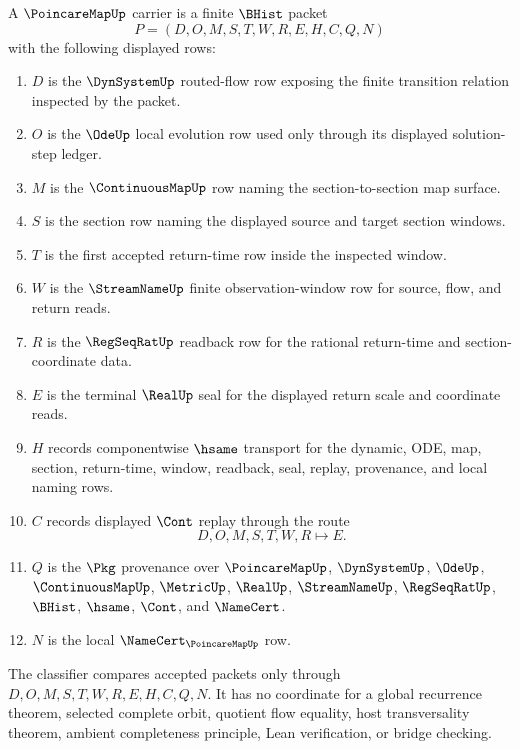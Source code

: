 \begin{definition}
\label{def:poincare-map-carrier}
A $\PoincareMapUp$ carrier is a finite $\BHist$ packet
$$
P=(D,O,M,S,T,W,R,E,H,C,Q,N)
$$
with the following displayed rows:
\begin{enumerate}
\item $D$ is the $\DynSystemUp$ routed-flow row exposing the finite transition relation inspected by the packet.
\item $O$ is the $\OdeUp$ local evolution row used only through its displayed solution-step ledger.
\item $M$ is the $\ContinuousMapUp$ row naming the section-to-section map surface.
\item $S$ is the section row naming the displayed source and target section windows.
\item $T$ is the first accepted return-time row inside the inspected window.
\item $W$ is the $\StreamNameUp$ finite observation-window row for source, flow, and return reads.
\item $R$ is the $\RegSeqRatUp$ readback row for the rational return-time and section-coordinate data.
\item $E$ is the terminal $\RealUp$ seal for the displayed return scale and coordinate reads.
\item $H$ records componentwise $\hsame$ transport for the dynamic, ODE, map, section, return-time, window, readback, seal, replay, provenance, and local naming rows.
\item $C$ records displayed $\Cont$ replay through the route
$$
D,O,M,S,T,W,R \longmapsto E .
$$
\item $Q$ is the $\Pkg$ provenance over $\PoincareMapUp$, $\DynSystemUp$, $\OdeUp$, $\ContinuousMapUp$, $\MetricUp$, $\RealUp$, $\StreamNameUp$, $\RegSeqRatUp$, $\BHist$, $\hsame$, $\Cont$, and $\NameCert$.
\item $N$ is the local $\NameCert_{\PoincareMapUp}$ row.
\end{enumerate}
The classifier compares accepted packets only through $D,O,M,S,T,W,R,E,H,C,Q,N$. It has no coordinate for a global recurrence theorem, selected complete orbit, quotient flow equality, host transversality theorem, ambient completeness principle, Lean verification, or bridge checking.
\end{definition}

